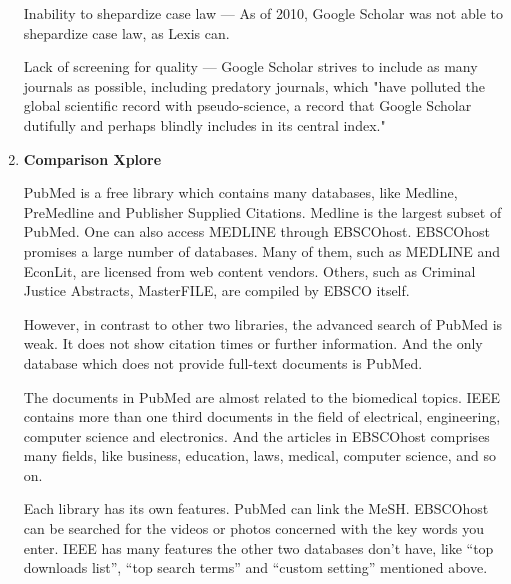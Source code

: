 \begin{enumerate}
	Inability to shepardize case law — As of 2010, Google Scholar was not able to shepardize case law, as Lexis can.
	
	Lack of screening for quality — Google Scholar strives to include as many journals as possible, including predatory journals, which "have polluted the global scientific record with pseudo-science, a record that Google Scholar dutifully and perhaps blindly includes in its central index."\\
	
	\item\textbf{Comparison Xplore}
	\setlength{\parindent}{1em}
	
	PubMed is a free library which contains many databases, like Medline, PreMedline and Publisher Supplied Citations.
    Medline is the largest subset of PubMed.
    One can also access MEDLINE through EBSCOhost.  
    EBSCOhost promises a large number of databases. 
	Many of them, such as MEDLINE and EconLit, are licensed from web content vendors.
    Others, such as Criminal Justice Abstracts, MasterFILE, are compiled by EBSCO itself.

    However, in contrast to other two libraries, the advanced search of PubMed is weak. 
    It does not show citation times or further information.
    And the only database which does not provide full-text documents is PubMed. 

    The documents in PubMed are almost related to the biomedical topics.
    IEEE contains more than one third documents in the field of electrical, engineering, computer science and electronics.
    And the articles in EBSCOhost comprises many fields, like business, education, laws, medical, computer science, and so on.

    Each library has its own features. PubMed can link the MeSH. EBSCOhost can be searched for the videos or photos concerned with the key words you enter. 
    IEEE has many features the other two databases don’t have, like “top downloads list”, “top search terms” and “custom setting” mentioned above.

    

\end{enumerate}

